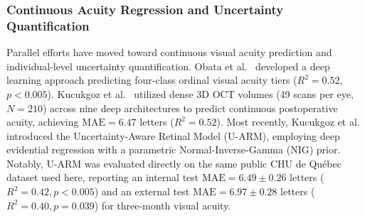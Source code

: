 \documentclass[preprint,12pt]{elsarticle}
\begin{document}
\subsubsection{Continuous Acuity Regression and Uncertainty Quantification}
Parallel efforts have moved toward continuous visual acuity prediction and individual-level uncertainty quantification. Obata et al.~\cite{obata2021} developed a deep learning approach predicting four-class ordinal visual acuity tiers ($R^2 = 0.52$, $p < 0.005$). Kucukgoz et al.~\cite{kucukgoz2024} utilized dense 3D OCT volumes (49 scans per eye, $N=210$) across nine deep architectures to predict continuous postoperative acuity, achieving $\text{MAE} = 6.47$ letters ($R^2 = 0.52$). Most recently, Kucukgoz et al.~\cite{kucukgoz2025} introduced the Uncertainty-Aware Retinal Model (U-ARM), employing deep evidential regression with a parametric Normal-Inverse-Gamma (NIG) prior. Notably, U-ARM was evaluated directly on the same public CHU de Qu\'{e}bec dataset used here, reporting an internal test $\text{MAE} = 6.49 \pm 0.26$ letters ($R^2 = 0.42, p < 0.005$) and an external test $\text{MAE} = 6.97 \pm 0.28$ letters ($R^2 = 0.40, p = 0.039$) for three-month visual acuity.
\end{document}
